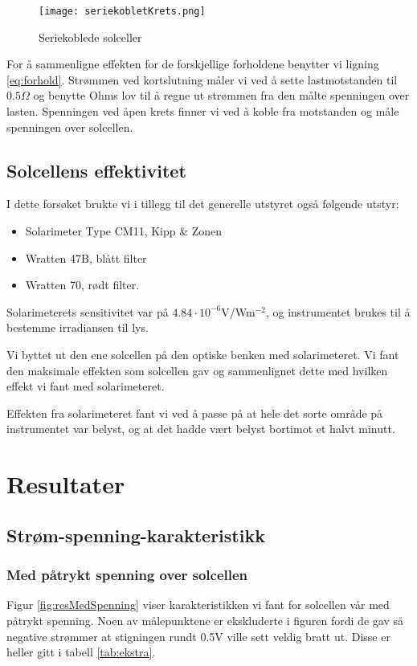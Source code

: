 \documentclass[a4paper,11pt, twocolumn]{article}
\begin{document}
\begin{figure}[!ht]
	\texttt{[image: seriekobletKrets.png]}
	\caption{Seriekoblede solceller}
	\label{fig:serie}
\end{figure}

For å sammenligne effekten for de forskjellige forholdene benytter vi ligning \eqref{eq:forhold}. Strømmen ved kortslutning måler vi ved å sette lastmotstanden til $0.5\Omega$ og benytte Ohms lov til å regne ut strømmen fra den målte spenningen over lasten. Spenningen ved åpen krets finner vi ved å koble fra motstanden og måle spenningen over solcellen.

\subsection{Solcellens effektivitet}
I dette forsøket brukte vi i tillegg til det generelle utstyret også følgende utstyr:

\begin{itemize}
	\item Solarimeter Type CM11, Kipp \& Zonen
	\item Wratten 47B, blått filter
	\item Wratten 70, rødt filter.
\end{itemize}
Solarimeterets sensitivitet var på $4.84\cdot10^{-6}$V/Wm$^{-2}$, og instrumentet brukes til å bestemme irradiansen til lys.

Vi byttet ut den ene solcellen på den optiske benken med solarimeteret. Vi fant den maksimale effekten som solcellen gav og sammenlignet dette med hvilken effekt vi fant med solarimeteret. 

Effekten fra solarimeteret fant vi ved å passe på at hele det sorte område på instrumentet var belyst, og at det hadde vært belyst bortimot et halvt minutt.

\section{Resultater}
\subsection{Strøm-spenning-karakteristikk}
\subsubsection{Med påtrykt spenning over solcellen}
Figur \ref{fig:resMedSpenning} viser karakteristikken vi fant for solcellen vår med påtrykt spenning. Noen av målepunktene er ekskluderte i figuren fordi de gav så negative strømmer at stigningen rundt 0.5V ville sett veldig bratt ut. Disse er heller gitt i tabell \ref{tab:ekstra}.
\end{document}
